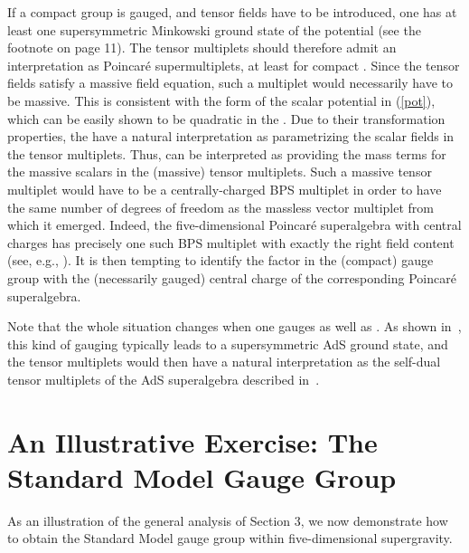 \documentclass[a4paper,11pt]{article}
\begin{document}
If a compact group \coordHE{} is gauged, and tensor fields have to be
introduced, one has at least one \coordHE{} supersymmetric Minkowski
ground state of the potential \coordHE{} (see the footnote on page 11). The
tensor multiplets should therefore admit an interpretation as
\coordHE{} Poincar\'{e} supermultiplets, at least for compact \coordHE{}. 
Since the tensor fields satisfy a massive field equation, such a multiplet
would necessarily have to be massive. This is consistent with the form of
the scalar potential \coordHE{} in (\ref{pot}), which can be easily shown
to be quadratic in the \coordHE{}. Due to their \coordHE{} transformation
properties, the \coordHE{} have a natural interpretation as parametrizing the
scalar fields in the tensor multiplets. Thus, \coordHE{} can be interpreted
as providing the mass terms for the massive scalars in the (massive) 
tensor multiplets. Such a massive tensor multiplet would have to be a
centrally-charged BPS multiplet in order to have the same number of
degrees of freedom as the massless vector multiplet from which it emerged. 
Indeed, the five-dimensional \coordHE{} Poincar\'{e} superalgebra
with central charges has precisely one such BPS multiplet with exactly the
right field content (see, e.g., \cite{Strathdee,PTvN}).  It is then
tempting to identify the \coordHE{} factor in the (compact)  gauge group \coordHE{}
with the (necessarily gauged) central charge of the corresponding
Poincar\'{e} superalgebra.

Note that the whole situation changes when one gauges \coordHE{} as well as
\coordHE{}. As shown in~\cite{GZ2}, this kind of gauging typically leads to a
\coordHE{} supersymmetric AdS ground state, and the tensor
multiplets would then have a natural interpretation as the self-dual
tensor multiplets of the \coordHE{} AdS superalgebra described
in~\cite{GRW}.

\section{An Illustrative Exercise: The Standard Model Gauge Group}

As an illustration of the general analysis of Section 3, we now
demonstrate how to obtain the Standard Model gauge group
\coordHE{} within five-dimensional
supergravity.
\end{document}
